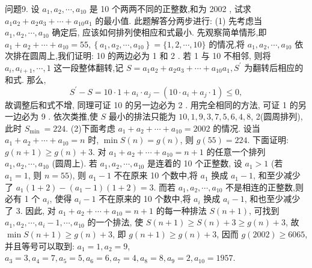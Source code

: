 问题9. 设 $a_1, a_2, \cdots, a_{10}$ 是 10 个两两不同的正整数,和为 2002 , 试求 $a_1 a_2+ a_2 a_3+\cdots+a_{10} a_1$ 的最小值.
此题解答分两步进行:
(1) 先考虑当 $a_1, a_2, \cdots, a_{10}$ 确定后, 应该如何排列使相应和式最小.
先观察简单情形,即 $a_1+a_2+\cdots+a_{10}=55,\left\{a_1, a_2, \cdots, a_{10}\right\}=\{1,2, \cdots, 10\}$ 的情况,将 $a_1, a_2, \cdots, a_{10}$ 依次排在圆周上,我们证明: 10 的两边必为 1 和 2 .
若 1 与 10 不相邻, 则将 $a_i, a_{i+1}, \cdots, 1$ 这一段整体翻转,记 $S=a_1 a_2+ a_2 a_3+\cdots+a_{10} a_1, S^{\prime}$ 为翻转后相应的和式.
那么,
$$
S^{\prime}-S=10 \cdot 1+a_i \cdot a_j-\left(10 \cdot a_i+a_j \cdot 1\right) \leqslant 0,
$$
故调整后和式不增, 同理可证 10 的另一边必为 2 .
用完全相同的方法, 可证 1 的另一边必为 9 .
依次类推,使 $S$ 最小的排法只能为 $10,1,9,3,7,5,6,4,8$, 2(圆周排列), 此时 $S_{\text {min }}=224$.
(2)下面考虑 $a_1+a_2+\cdots+a_{10}=2002$ 的情况.
设当 $a_1+a_2+\cdots+a_{10}=n$ 时, $\min S(n)=g(n)$, 则 $g(55)=224$.
下面证明: $g(n+1) \geqslant g(n)+3$.
对 $a_1+a_2+\cdots+a_{10}=n+1$ 的任意一个排列 $a_1, a_2, \cdots, a_{10}$ (圆周上).
若 $a_1, a_2, \cdots, a_{10}$ 是连着的 10 个正整数, 设 $a_1>1$ (若 $a_1=1$, 则 $n= 55)$, 则 $a_1-1$ 不在原来 10 个数中,将 $a_1$ 换成 $a_1-1$, 和至少减少了 $a_1(1+2)- \left(a_1-1\right)(1+2)=3$.
而若 $a_1, a_2, \cdots, a_{10}$ 不是相连的正整数,则必有 1 个 $a_i$, 使得 $a_i-1$ 不在原来的 10 个数中,将 $a_i$ 换成 $a_i-1$, 和也至少减少了 3. 因此, 对 $a_1+a_2+\cdots+ a_{10}=n+1$ 的每一种排法 $S(n+1)$, 可找到 $a_1, a_2, \cdots, a_i-1, \cdots, a_{10}$ 的一个排法, 使 $S(n+1) \geqslant S(n)+3 \geqslant g(n)+3$, 故 $\min S(n+1) \geqslant g(n)+3$, 即 $g(n+1) \geqslant g(n)+3$, 因而 $g(2002) \geqslant 6065$, 并且等号可以取到: $a_1=1, a_2=9$, $a_3=3, a_4=7, a_5=5, a_6=6, a_7=4, a_8=8, a_9=2, a_{10}=1957$.



